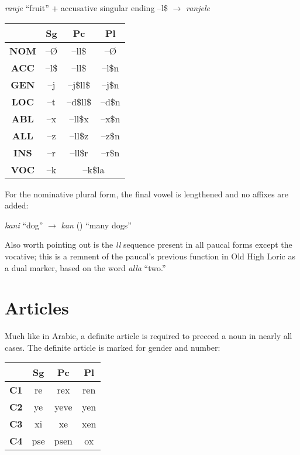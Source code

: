 \documentclass[oneside]{book}
\newcommand{\ti}{\textipa}
\begin{document}
\smallskip
\begin{exe}
\ex \textit{ranje} ``fruit'' + accusative singular ending --l\$ $\rightarrow$ \textit{ranjele}
\end{exe}
\begin{center}
\begin{tabular}{c| c c c}
  & \textbf{Sg} & \textbf{Pc} & \textbf{Pl} \\
  \hline
\textbf{NOM} & --\O & --ll\$ & --\O\textipa{:} \\
\textbf{ACC} & --l\$ & --ll\$ & --l\$n \\
\textbf{GEN} & --j & --j\$ll\$ & --j\$n \\
\textbf{LOC} & --t & --d\$ll\$  &--d\$n \\
\textbf{ABL} & --x & --ll\$x & --x\$n \\
\textbf{ALL} & --z & --ll\$z & --z\$n \\
\textbf{INS} & --r & --ll\$r & --r\$n \\
\textbf{VOC} & --k & \multicolumn{2}{c}{--k\$la} \\


\end{tabular}

\end{center}
For the nominative plural form, the final vowel is lengthened and no affixes are added:


\begin{exe}
\ex \textit{kani} ``dog'' $\rightarrow$ \textit{kan\ti{\=i}} () ``many dogs''
\end{exe}

Also worth pointing out is the \textit{ll} sequence present in all paucal forms except the vocative; this is a remnent of the paucal's previous function in Old High Loric as a dual marker, based on the word \textit{alla} ``two.''
\section{Articles}
Much like in Arabic, a definite article is required to preceed a noun in nearly all cases. The definite article is marked for gender and number:

\begin{center}
\begin{tabular}{c| c c c }
& \textbf{Sg} & \textbf{Pc} & \textbf{Pl} \\
\hline
\textbf{C1} & re & rex & ren \\
\textbf{C2} & ye & yeve & yen \\
\textbf{C3} & xi & xe & xen \\
\textbf{C4} & pse & psen & ox
\end{tabular}
\end{center}
\end{document}
